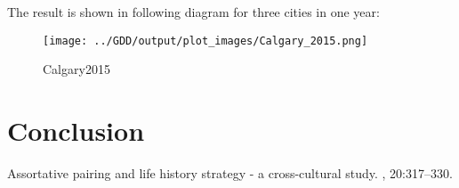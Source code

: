 \documentclass[DIV=calc, paper=a4, fontsize=11pt, twocolumn]{scrartcl}
\begin{document}
The result is shown in following diagram for three cities in one year:
\begin{figure}[h!]
	\centering
	\texttt{[image: ../GDD/output/plot\_images/Calgary\_2015.png]}
	\caption{Calgary2015}
	\label{fig:method}
\end{figure}
\section{Conclusion}

\begin{thebibliography}{99}
\newblock Assortative pairing and life history strategy - a cross-cultural
  study.
, 20:317--330.
 \end{thebibliography}
\end{document}
